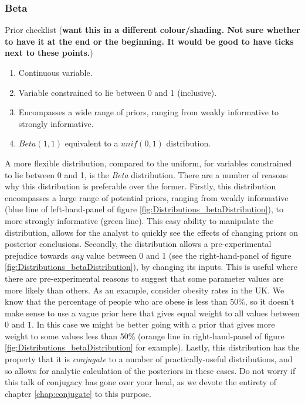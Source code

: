 \documentclass[11pt,fullpage]{book}
\begin{document}
\subsubsection{Beta}\label{sec:Distributions_beta}
Prior checklist (\textbf{want this in a different colour/shading. Not sure whether to have it at the end or the beginning. It would be good to have ticks next to these points.})

\begin{enumerate} 
\item Continuous variable.
\item Variable constrained to lie between 0 and 1 (inclusive).
\item Encompasses a wide range of priors, ranging from weakly informative to strongly informative.
\item $Beta(1,1)$ equivalent to a $unif(0,1)$ distribution. 
\end{enumerate}

A more flexible distribution, compared to the uniform, for variables constrained to lie between 0 and 1, is the \textit{Beta} distribution. There are a number of reasons why this distribution is preferable over the former. Firstly, this distribution encompasses a large range of potential priors, ranging from weakly informative (blue line of left-hand-panel of figure \ref{fig:Distributions_betaDistribution}), to more strongly informative (green line). This easy ability to manipulate the distribution, allows for the analyst to quickly see the effects of changing priors on posterior conclusions. Secondly, the distribution allows a pre-experimental prejudice towards \textit{any} value between 0 and 1 (see the right-hand-panel of figure \ref{fig:Distributions_betaDistribution}), by changing its inputs. This is useful where there are pre-experimental reasons to suggest that some parameter values are more likely than others. As an example, consider obesity rates in the UK. We know that the percentage of people who are obese is less than 50\%, so it doesn't make sense to use a vague prior here that gives equal weight to all values between 0 and 1. In this case we might be better going with a prior that gives more weight to some values less than 50\% (orange line in right-hand-panel of figure \ref{fig:Distributions_betaDistribution} for example). Lastly, this distribution has the property that it is \textit{conjugate} to a number of practically-useful distributions, and so allows for analytic calculation of the posteriors in these cases. Do not worry if this talk of conjugacy has gone over your head, as we devote the entirety of chapter \ref{chap:conjugate} to this purpose.
\end{document}
